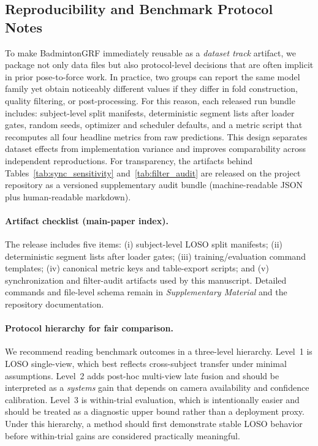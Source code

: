 \documentclass[sigconf,screen]{acmart}
\newcommand{\BadmintonGRFSupplementary}{\emph{Supplementary Material}}
\begin{document}
\subsection{Reproducibility and Benchmark Protocol Notes}
\label{sec:repro_notes}
To make BadmintonGRF immediately reusable as a \emph{dataset track} artifact, we package not only data files but also protocol-level decisions that are often implicit in prior pose-to-force work.
In practice, two groups can report the same model family yet obtain noticeably different values if they differ in fold construction, quality filtering, or post-processing.
For this reason, each released run bundle includes: subject-level split manifests, deterministic segment lists after loader gates, random seeds, optimizer and scheduler defaults, and a metric script that recomputes all four headline metrics from raw predictions.
This design separates dataset effects from implementation variance and improves comparability across independent reproductions.
For transparency, the artifacts behind Tables~\ref{tab:sync_sensitivity} and~\ref{tab:filter_audit} are released on the project repository as a versioned supplementary audit bundle (machine-readable JSON plus human-readable markdown).

\paragraph{Artifact checklist (main-paper index).}
The release includes five items: (i) subject-level LOSO split manifests; (ii) deterministic segment lists after loader gates; (iii) training/evaluation command templates; (iv) canonical metric keys and table-export scripts; and (v) synchronization and filter-audit artifacts used by this manuscript.
Detailed commands and file-level schema remain in \BadmintonGRFSupplementary{} and the repository documentation.

\paragraph{Protocol hierarchy for fair comparison.}
We recommend reading benchmark outcomes in a three-level hierarchy.
Level~1 is \textsc{LOSO} single-view, which best reflects cross-subject transfer under minimal assumptions.
Level~2 adds post-hoc multi-view late fusion and should be interpreted as a \emph{systems} gain that depends on camera availability and confidence calibration.
Level~3 is within-trial evaluation, which is intentionally easier and should be treated as a diagnostic upper bound rather than a deployment proxy.
Under this hierarchy, a method should first demonstrate stable \textsc{LOSO} behavior before within-trial gains are considered practically meaningful.
\end{document}
